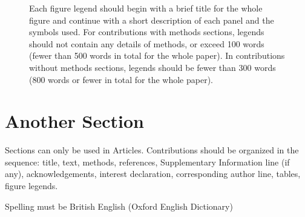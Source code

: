 \documentclass{nature}
\begin{document}



\begin{figure}
\caption{Each figure legend should begin with a brief title for
the whole figure and continue with a short description of each
panel and the symbols used. For contributions with methods
sections, legends should not contain any details of methods, or
exceed 100 words (fewer than 500 words in total for the whole
paper). In contributions without methods sections, legends should
be fewer than 300 words (800 words or fewer in total for the whole
paper).}
\end{figure}

\section*{Another Section}

Sections can only be used in Articles.  Contributions should be
organized in the sequence: title, text, methods, references,
Supplementary Information line (if any), acknowledgements,
interest declaration, corresponding author line, tables, figure
legends.

Spelling must be British English (Oxford English Dictionary)
\end{document}

